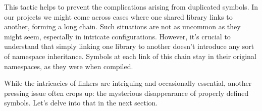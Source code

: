 This tactic helps to prevent the complications arising from duplicated symbols.
In our projects we might come across cases where one shared library links to another, forming a long chain. Such situations are not as uncommon as they might seem, especially in intricate configurations. However, it’s crucial to understand that simply linking one library to another doesn’t introduce any sort of namespace inheritance. Symbols at each link of this chain stay in their original namespaces, as they were when compiled.

While the intricacies of linkers are intriguing and occasionally essential, another pressing issue often crops up: the mysterious disappearance of properly defined symbols. Let’s delve into that in the next section.



